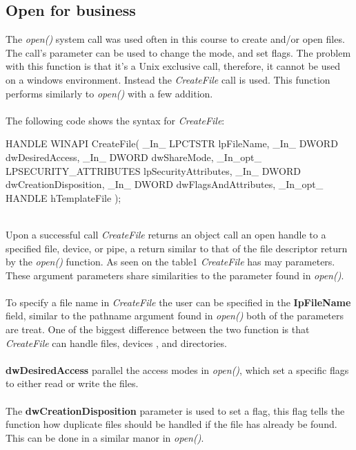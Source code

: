 \documentclass[a4paper]{article}
\begin{document}
\subsection{Open for business}
The \textit{open()} system call was used often in this course to create and/or open files. The call's parameter can be used to change the mode, and set flags. The problem with this function is that it’s a Unix exclusive call, therefore, it cannot be used on a windows environment. Instead the \textit{CreateFile} call is used. This function performs similarly to \textit{open()} with a few addition.\\
\\
The following code shows the syntax for \textit{CreateFile}:\\
\begin{code}

HANDLE WINAPI CreateFile(
  _In_      LPCTSTR lpFileName,
  _In_      DWORD dwDesiredAccess,
  _In_      DWORD dwShareMode,
  _In_opt_  LPSECURITY_ATTRIBUTES lpSecurityAttributes,
  _In_      DWORD dwCreationDisposition,
  _In_      DWORD dwFlagsAndAttributes,
  _In_opt_  HANDLE hTemplateFile
);

\end{code}\\
Upon a successful call \textit{CreateFile} returns an object call an open handle to a specified file, device, or pipe, a return similar to that of the file descriptor return by the \textit{open()} function. As seen on the table1 \textit{CreateFile} has may parameters. These argument parameters share similarities to the parameter found in \textit{open()}. \\
\\
To specify a file name in \textit{CreateFile} the user can be specified in the \textbf{IpFileName} field, similar to the pathname argument found in \textit{open()} both of the parameters are treat. One of the biggest difference between the two function is that \textit{CreateFile} can handle files, devices , and directories.\\
\\
\textbf{dwDesiredAccess} parallel the access modes in \textit{open()}, which set a specific flags to either read or write the files. \\
\\
The \textbf{dwCreationDisposition} parameter is used to set a flag, this flag tells the function how duplicate files should be handled if the file has already be found. This can be done in a similar manor in \textit{open()}.\\
\end{document}
